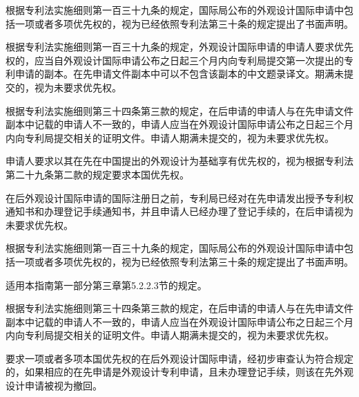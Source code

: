 根据专利法实施细则第一百三十九条的规定，国际局公布的外观设计国际申请中包括一项或者多项优先权的，视为已经依照专利法第三十条的规定提出了书面声明。

根据专利法实施细则第一百三十九条的规定，外观设计国际申请的申请人要求优先权的，应当自外观设计国际申请公布之日起三个月内向专利局提交第一次提出的专利申请的副本。在先申请文件副本中可以不包含该副本的中文题录译文。期满未提交的，视为未要求优先权。

根据专利法实施细则第三十四条第三款的规定，在后申请的申请人与在先申请文件副本中记载的申请人不一致的，申请人应当在外观设计国际申请公布之日起三个月内向专利局提交相关的证明文件。申请人期满未提交的，视为未要求优先权。

申请人要求以其在先在中国提出的外观设计为基础享有优先权的，视为根据专利法第二十九条第二款的规定要求本国优先权。

在后外观设计国际申请的国际注册日之前，专利局已经对在先申请发出授予专利权通知书和办理登记手续通知书，并且申请人已经办理了登记手续的，在后申请视为未要求优先权。

根据专利法实施细则第一百三十九条的规定，国际局公布的外观设计国际申请中包括一项或者多项优先权的，视为已经依照专利法第三十条的规定提出了书面声明。

适用本指南第一部分第三章第5.2.2.3节的规定。

根据专利法实施细则第三十四条第三款的规定，在后申请的申请人与在先申请文件副本中记载的申请人不一致的，申请人应当在外观设计国际申请公布之日起三个月内向专利局提交相关的证明文件。申请人期满未提交的，视为未要求优先权。

{\setlength{\parindent}{22.2bp}要求一项或者多项本国优先权的在后外观设计国际申请，经初步审查认为符合规定的，如果相应的在先申请是外观设计专利申请，且未办理登记手续，则该在先外观设计申请被视为撤回。\par}


